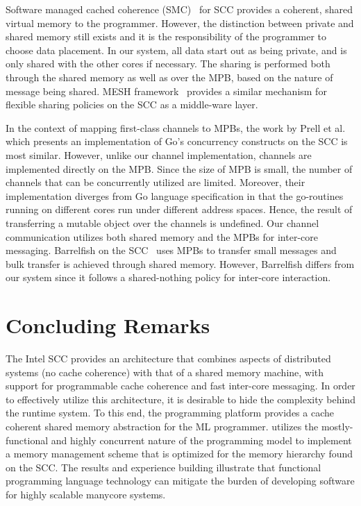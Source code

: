 Software managed cached coherence (SMC)~\cite{SMC} for SCC provides a coherent,
shared virtual memory to the programmer. However, the distinction between
private and shared memory still exists and it is the responsibility of the
programmer to choose data placement. In our system, all data start out as being
private, and is only shared with the other cores if necessary. The sharing is
performed both through the shared memory as well as over the MPB, based on the
nature of message being shared. MESH framework~\cite{Prescher11} provides a
similar mechanism for flexible sharing policies on the SCC as a middle-ware
layer.

In the context of mapping first-class channels to MPBs, the work by Prell et
al.~\cite{Prell12} which presents an implementation of Go's concurrency
constructs on the SCC is most similar. However, unlike our channel
implementation, channels are implemented directly on the MPB. Since the size of
MPB is small, the number of channels that can be concurrently utilized are
limited. Moreover, their implementation diverges from Go language specification
in that the go-routines running on different cores run under different address
spaces. Hence, the result of transferring a mutable object over the channels is
undefined. Our channel communication utilizes both shared memory and the MPBs
for inter-core messaging. Barrelfish on the SCC~\cite{Peter11} uses MPBs to
transfer small messages and bulk transfer is achieved through shared memory.
However, Barrelfish differs from our system since it follows a shared-nothing
policy for inter-core interaction.

\section{Concluding Remarks}

The Intel SCC provides an architecture that combines aspects of distributed
systems (no cache coherence) with that of a shared memory machine, with support
for programmable cache coherence and fast inter-core messaging. In order to
effectively utilize this architecture, it is desirable to hide the complexity
behind the runtime system. To this end, the \MMSCC programming platform
provides a cache coherent shared memory abstraction for the ML programmer.
\MMSCC utilizes the mostly-functional and highly concurrent nature of the
programming model to implement a memory management scheme that is optimized for
the memory hierarchy found on the SCC. The results and experience building
\MMSCC illustrate that functional programming language technology can mitigate
the burden of developing software for highly scalable manycore systems.
